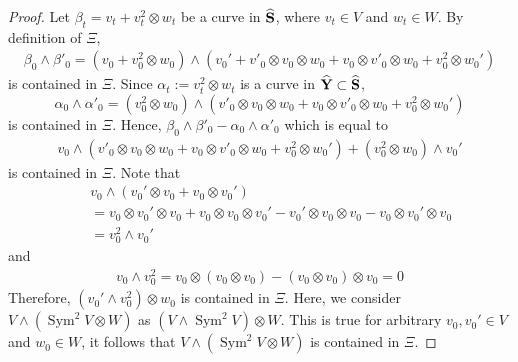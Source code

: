 \documentclass[12pt]{amsart}
\theoremstyle{plain}
\theoremstyle{definition}
\def\Sym{\operatorname{Sym}}
\begin{document}
\begin{proof}
Let $\beta_t = v_t + v_t^2 \otimes w_t$ be a curve in $\widehat{\bf S}$, where $v_t \in V$ and $w_t \in W$.  By definition of $\Xi$,
 \begin{eqnarray*}
 \beta_0 \wedge \beta'_0 = (v_0 + v_0 ^2 \otimes w_0) \wedge (v_0' +  v'_0 \otimes v_0 \otimes w_0 + v_0 \otimes v'_0 \otimes w_0 + v_0^2 \otimes w_0')
 \end{eqnarray*}
is contained in $\Xi$. Since $\alpha_t:=v_t^2 \otimes w_t$ is a curve in $\widehat{\bf Y} \subset \widehat{\bf S}$,
 $$\alpha_0 \wedge \alpha'_0=(v_0 ^2 \otimes w_0) \wedge (v'_0 \otimes v_0 \otimes w_0 + v_0 \otimes v'_0 \otimes w_0+ v_0^2 \otimes w_0') $$ is contained in $\Xi$. Hence,
$\beta_0 \wedge \beta'_0 -\alpha_0 \wedge \alpha'_0$ which is equal to
 \begin{eqnarray*}
   v_0  \wedge ( v'_0 \otimes v_0 \otimes w_0 + v_0 \otimes v'_0 \otimes w_0 + v_0^2 \otimes w_0')+ (v_0 ^2 \otimes w_0) \wedge  v_0'
 \end{eqnarray*}
 is contained in $\Xi$. Note that
 \begin{eqnarray*}
&&v_0 \wedge (v_0' \otimes v_0 + v_0 \otimes v_0') \\
&& = v_0 \otimes v_0' \otimes v_0 + v_0 \otimes v_0 \otimes v_0' - v_0' \otimes v_0 \otimes v_0 - v_0 \otimes v_0' \otimes v_0 \\
 &&=  v_0^2 \wedge v_0'
 \end{eqnarray*}
 and
 \begin{eqnarray*}
 v_0 \wedge v_0^2 = v_0 \otimes (v_0 \otimes v_0) -(v_0 \otimes v_0) \otimes v_0 = 0
 \end{eqnarray*}
 Therefore, $(v_0' \wedge v_0^2)\otimes w_0$ is contained in $\Xi$.  Here, we consider $V \wedge (\Sym^2 V \otimes W)$ as $(V \wedge \Sym^2 V )\otimes W$.
 This is true for arbitrary $v_0, v_0' \in V$ and $w_0 \in W$, it follows that $V \wedge (\Sym ^2 V \otimes W)$ is contained in $\Xi$.
\end{proof}
\end{document}
